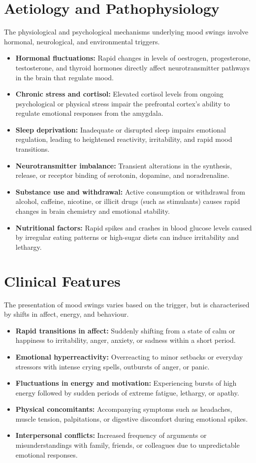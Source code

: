 \section*{Aetiology and Pathophysiology}
The physiological and psychological mechanisms underlying mood swings involve hormonal, neurological, and environmental triggers.
\begin{itemize}
    \item \textbf{Hormonal fluctuations:} Rapid changes in levels of oestrogen, progesterone, testosterone, and thyroid hormones directly affect neurotransmitter pathways in the brain that regulate mood.
    \item \textbf{Chronic stress and cortisol:} Elevated cortisol levels from ongoing psychological or physical stress impair the prefrontal cortex's ability to regulate emotional responses from the amygdala.
    \item \textbf{Sleep deprivation:} Inadequate or disrupted sleep impairs emotional regulation, leading to heightened reactivity, irritability, and rapid mood transitions.
    \item \textbf{Neurotransmitter imbalance:} Transient alterations in the synthesis, release, or receptor binding of serotonin, dopamine, and noradrenaline.
    \item \textbf{Substance use and withdrawal:} Active consumption or withdrawal from alcohol, caffeine, nicotine, or illicit drugs (such as stimulants) causes rapid changes in brain chemistry and emotional stability.
    \item \textbf{Nutritional factors:} Rapid spikes and crashes in blood glucose levels caused by irregular eating patterns or high-sugar diets can induce irritability and lethargy.
\end{itemize}

\section*{Clinical Features}
The presentation of mood swings varies based on the trigger, but is characterised by shifts in affect, energy, and behaviour.
\begin{itemize}
    \item \textbf{Rapid transitions in affect:} Suddenly shifting from a state of calm or happiness to irritability, anger, anxiety, or sadness within a short period.
    \item \textbf{Emotional hyperreactivity:} Overreacting to minor setbacks or everyday stressors with intense crying spells, outbursts of anger, or panic.
    \item \textbf{Fluctuations in energy and motivation:} Experiencing bursts of high energy followed by sudden periods of extreme fatigue, lethargy, or apathy.
    \item \textbf{Physical concomitants:} Accompanying symptoms such as headaches, muscle tension, palpitations, or digestive discomfort during emotional spikes.
    \item \textbf{Interpersonal conflicts:} Increased frequency of arguments or misunderstandings with family, friends, or colleagues due to unpredictable emotional responses.
\end{itemize}

